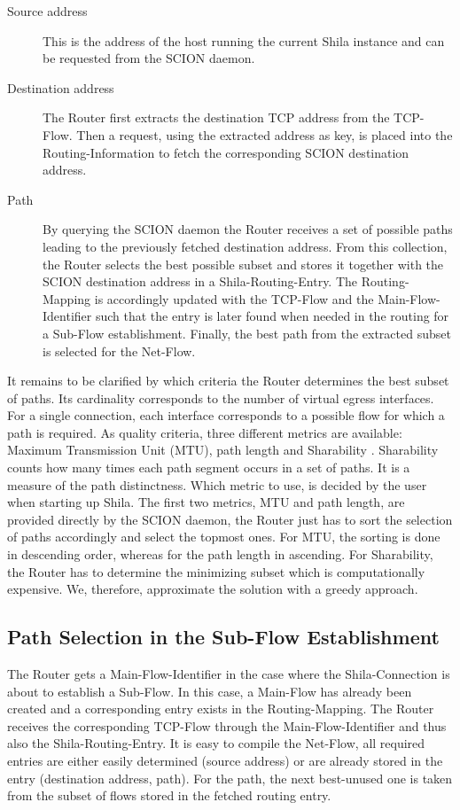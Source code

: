 \begin{description}
	\item[Source address] This is the address of the host running the current Shila instance and can be requested from the SCION daemon.
	\item[Destination address] The Router first extracts the destination TCP address from the TCP-Flow. Then a request, using the extracted address as key, is placed into the Routing-Information to fetch the corresponding SCION destination address.
	\item[Path] By querying the SCION daemon the Router receives a set of possible paths leading to the previously fetched destination address. From this collection, the Router selects the best possible subset and stores it together with the SCION destination address in a Shila-Routing-Entry. The Routing-Mapping is accordingly updated with the TCP-Flow and the Main-Flow-Identifier such that the entry is later found when needed in the routing for a Sub-Flow establishment. Finally, the best path from the extracted subset is selected for the Net-Flow.
\end{description}

It remains to be clarified by which criteria the Router determines the best subset of paths. Its cardinality corresponds to the number of virtual egress interfaces. For a single connection, each interface corresponds to a possible flow for which a path is required. As quality criteria, three different metrics are available: Maximum Transmission Unit (MTU), path length and Sharability \cite{Sharability}. Sharability counts how many times each path segment occurs in a set of paths. It is a measure of the path distinctness. Which metric to use, is decided by the user when starting up Shila. The first two metrics, MTU and path length, are provided directly by the SCION daemon, the Router just has to sort the selection of paths accordingly and select the topmost ones. For MTU, the sorting is done in descending order, whereas for the path length in ascending. For Sharability, the Router has to determine the minimizing subset which is computationally expensive. We, therefore, approximate the solution with a greedy approach.

\subsection*{Path Selection in the Sub-Flow Establishment}

The Router gets a Main-Flow-Identifier in the case where the Shila-Connection is about to establish a Sub-Flow. In this case, a Main-Flow has already been created and a corresponding entry exists in the Routing-Mapping. The Router receives the corresponding TCP-Flow through the Main-Flow-Identifier and thus also the Shila-Routing-Entry. It is easy to compile the Net-Flow, all required entries are either easily determined (source address) or are already stored in the entry (destination address, path). For the path, the next best-unused one is taken from the subset of flows stored in the fetched routing entry.

